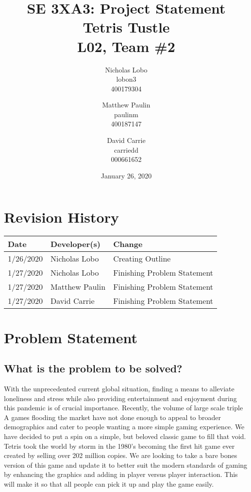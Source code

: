 \documentclass{article}
\title{SE 3XA3: Project Statement \\  Tetris Tustle  \\{\large L02, Team \#2}}
\author{Nicholas Lobo \\ lobon3 \\ 400179304 \and
		Matthew Paulin \\ paulinm \\ 400187147 \and
		David Carrie \\ carriedd \\   000661652 \and
}
\date{January 26, 2020}
\begin{document}
\maketitle
\newpage

\tableofcontents
\newpage



\begin{table}[hp]
\section{Revision History} \label{TblRevisionHistory}
\begin{tabularx}{\textwidth}{llX}
\hline
\textbf{Date} & \textbf{Developer(s)} & \textbf{Change}\\
\hline
1/26/2020 & Nicholas Lobo & Creating Outline\\
1/27/2020 & Nicholas Lobo & Finishing Problem Statement\\
1/27/2020 & Matthew Paulin & Finishing Problem Statement\\
1/27/2020 & David Carrie & Finishing Problem Statement\\
\hline
\end{tabularx}
\end{table}

\newpage

\section{Problem Statement}
\subsection{What is the problem to be solved?}
With the unprecedented current global situation, finding a means to alleviate loneliness and stress while also providing entertainment and enjoyment during this  pandemic is of crucial importance. Recently, the volume of large scale triple A games flooding the market have not done enough to appeal to broader demographics and cater to people wanting a more simple gaming experience. We have decided to put a spin on a simple, but beloved classic game to fill that void. Tetris took the world by storm in the 1980’s becoming the first hit game ever created by selling over 202 million copies. We are looking to take a bare bones version of this game and update it to better suit the modern standards of gaming by enhancing the graphics and adding in player versus player interaction. This will make it so that all people can pick it up and play the game easily. 
\end{document}
